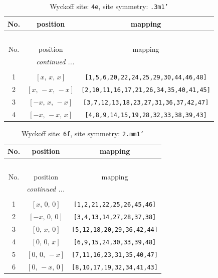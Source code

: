 \documentclass[fleqn,8pt]{jsarticle}
\begin{document}
\renewcommand{\arraystretch}{1.2}
\begin{longtable}{ccc}
\caption{Wyckoff site: {\tt 4e}, site symmetry: {\tt .3m1'}}
 \\
 \hline \hline
No. & position & mapping \\ \hline \endfirsthead

\multicolumn{2}{l}{\tablename\ \thetable{}} \\
 \hline \hline
No. & position & mapping \\ \hline \endhead

 \hline \hline
\multicolumn{2}{r}{\footnotesize\it continued ...} \\ \endfoot

 \hline \hline
\multicolumn{2}{r}{} \\ \endlastfoot

1 & $\left[ x,\, x,\, x \right]$ & {\tt [1,5,6,20,22,24,25,29,30,44,46,48]} \\ \hline
2 & $\left[ x,\, - x,\, - x \right]$ & {\tt [2,10,11,16,17,21,26,34,35,40,41,45]} \\ \hline
3 & $\left[ - x,\, x,\, - x \right]$ & {\tt [3,7,12,13,18,23,27,31,36,37,42,47]} \\ \hline
4 & $\left[ - x,\, - x,\, x \right]$ & {\tt [4,8,9,14,15,19,28,32,33,38,39,43]} \\
\end{longtable}
\renewcommand{\arraystretch}{1.2}
\begin{longtable}{ccc}
\caption{Wyckoff site: {\tt 6f}, site symmetry: {\tt 2.mm1'}}
 \\
 \hline \hline
No. & position & mapping \\ \hline \endfirsthead

\multicolumn{2}{l}{\tablename\ \thetable{}} \\
 \hline \hline
No. & position & mapping \\ \hline \endhead

 \hline \hline
\multicolumn{2}{r}{\footnotesize\it continued ...} \\ \endfoot

 \hline \hline
\multicolumn{2}{r}{} \\ \endlastfoot

1 & $\left[ x,\, 0,\, 0 \right]$ & {\tt [1,2,21,22,25,26,45,46]} \\ \hline
2 & $\left[ - x,\, 0,\, 0 \right]$ & {\tt [3,4,13,14,27,28,37,38]} \\ \hline
3 & $\left[ 0,\, x,\, 0 \right]$ & {\tt [5,12,18,20,29,36,42,44]} \\ \hline
4 & $\left[ 0,\, 0,\, x \right]$ & {\tt [6,9,15,24,30,33,39,48]} \\ \hline
5 & $\left[ 0,\, 0,\, - x \right]$ & {\tt [7,11,16,23,31,35,40,47]} \\ \hline
6 & $\left[ 0,\, - x,\, 0 \right]$ & {\tt [8,10,17,19,32,34,41,43]} \\
\end{longtable}
\end{document}
